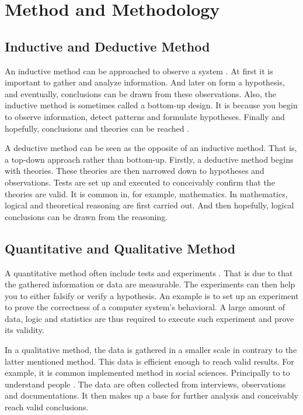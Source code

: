 \documentclass[a4paper,11pt]{kth-mag}
\begin{document}
\chapter{Method and Methodology}

\section{Inductive and Deductive Method}
An inductive method can be approached to observe a system \cite{robertdraft}.
At first it is important to gather and analyze information.
And later on form a hypothesis, and eventually, conclusions can be drawn from these observations.
Also, the inductive method is sometimes called a bottom-up design.
It is because you begin to observe information, detect patterns and formulate hypotheses.
Finally and hopefully, conclusions and theories can be reached \cite{web:induction}.

A deductive method can be seen as the opposite of an inductive method.
That is, a top-down approach rather than bottom-up.
Firstly, a deductive method begins with theories.
These theories are then narrowed down to hypotheses and observations.
Tests are set up and executed to conceivably confirm that the theories are valid.
It is common in, for example, mathematics.
In mathematics, logical and theoretical reasoning are first carried out.
And then hopefully, logical conclusions can be drawn from the reasoning.

\section{Quantitative and Qualitative Method}
A quantitative method often include tests and experiments \cite{haakansson2013portal}.
That is due to that the gathered information or data are measurable.
The experiments can then help you to either falsify or verify a hypothesis.
An example is to set up an experiment to prove the correctness of a computer system's behavioral.
A large amount of data, logic and statistics are thus required to execute such experiment and prove its validity.

In a qualitative method, the data is gathered in a smaller scale in contrary to the latter mentioned method.
This data is efficient enough to reach valid results.
For example, it is common implemented method in social sciences.
Principally to to understand people \cite{merriam2009qualitative}.
The data are often collected from interviews, observations and documentations.
It then makes up a base for further analysis and conceivably reach valid conclusions.
\end{document}
